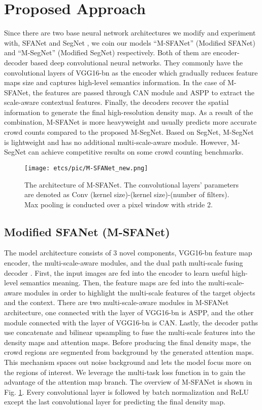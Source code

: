 \documentclass[10pt, conference, a4paper]{IEEEtran}
\begin{document}
\section{Proposed Approach}
Since there are two base neural network architectures we modify and experiment with, SFANet \cite{zhu2019dual} and SegNet \cite{badrinarayanan2017segnet}, we coin our models ``M-SFANet'' (Modified SFANet) and ``M-SegNet'' (Modified SegNet) respectively. Both of them are encoder-decoder based deep convolutional neural networks. They commonly have the convolutional layers of VGG16-bn as the encoder which gradually reduces feature maps size and captures high-level semantics information. In the case of M-SFANet, the features are passed through CAN \cite{liu2019context} module and ASPP \cite{chen2017deeplab} to extract the scale-aware contextual features. Finally, the decoders recover the spatial information to generate the final high-resolution density map. As a result of the combination, M-SFANet is more heavyweight and usually predicts more accurate crowd counts compared to the proposed M-SegNet. Based on SegNet, M-SegNet is lightweight and has no additional multi-scale-aware module. However, M-SegNet can achieve competitive results on some crowd counting benchmarks.

\begin{figure}
    \centering
    \texttt{[image: etcs/pic/M-SFANet\_new.png]}
    \caption{The architecture of M-SFANet. The convolutional layers’ parameters are denoted as Conv (kernel size)-(kernel size)-(number of filters). Max pooling is conducted over a  pixel window with stride 2.}
    \label{fig:M-SFANet architecture}
\end{figure}

\subsection{Modified SFANet (M-SFANet)}
The model architecture consists of 3 novel components, VGG16-bn feature map encoder, the multi-scale-aware modules, and the dual path multi-scale fusing decoder \cite{zhu2019dual}. First, the input images are fed into the encoder to learn useful high-level semantics meaning. Then, the feature maps are fed into the multi-scale-aware modules in order to highlight the multi-scale features of the target objects and the context. There are two multi-scale-aware modules in M-SFANet architecture, one connected with the  layer of VGG16-bn is ASPP, and the other module connected with the  layer of VGG16-bn is CAN. Lastly, the decoder paths use concatenate and bilinear upsampling to fuse the multi-scale features into the density maps and attention maps. Before producing the final density maps, the crowd regions are segmented from background by the generated attention maps. This mechanism spaces out noise background and lets the model focus more on the regions of interest. We leverage the multi-task loss function in \cite{zhu2019dual} to gain the advantage of the attention map branch. The overview of M-SFANet is shown in Fig. \ref{fig:M-SFANet architecture}. Every convolutional layer is followed by batch normalization \cite{ioffe2015batch} and ReLU except the last convolutional layer for predicting the final density map.
\end{document}
